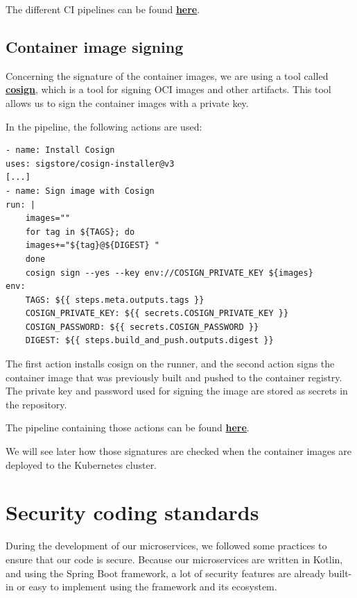 \documentclass[12pt,x11names]{article}
\begin{document}
The different CI pipelines can be found \href{https://github.com/thomas-mauran/LinkedOut/tree/main/.github/workflows}{\textbf{here}}.

\subsection{Container image signing}

Concerning the signature of the container images, we are using a tool called 
\href{https://github.com/sigstore/cosign}{\textbf{cosign}}, which is a tool for signing
OCI images and other artifacts. This tool allows us to sign the container images with 
a private key.

\medskip
In the pipeline, the following actions are used:

\begin{lstlisting}
- name: Install Cosign
uses: sigstore/cosign-installer@v3
[...]
- name: Sign image with Cosign
run: |
    images=""
    for tag in ${TAGS}; do
    images+="${tag}@${DIGEST} "
    done
    cosign sign --yes --key env://COSIGN_PRIVATE_KEY ${images}
env:
    TAGS: ${{ steps.meta.outputs.tags }}
    COSIGN_PRIVATE_KEY: ${{ secrets.COSIGN_PRIVATE_KEY }}
    COSIGN_PASSWORD: ${{ secrets.COSIGN_PASSWORD }}
    DIGEST: ${{ steps.build_and_push.outputs.digest }}
\end{lstlisting}

The first action installs cosign on the runner, and the second action signs the container
image that was previously built and pushed to the container registry. The private key and
password used for signing the image are stored as secrets in the repository.

\medskip
The pipeline containing those actions can be found \href{https://github.com/thomas-mauran/LinkedOut/blob/main/.github/workflows/flow_backend_build_push.yml}{\textbf{here}}.

\medskip
We will see later how those signatures are checked when the container images are deployed
to the Kubernetes cluster.

\section{Security coding standards}

During the development of our microservices, we followed some practices to ensure that
our code is secure. Because our microservices are written in Kotlin, and using the
Spring Boot framework, a lot of security features are already built-in or easy to
implement using the framework and its ecosystem.
\end{document}
